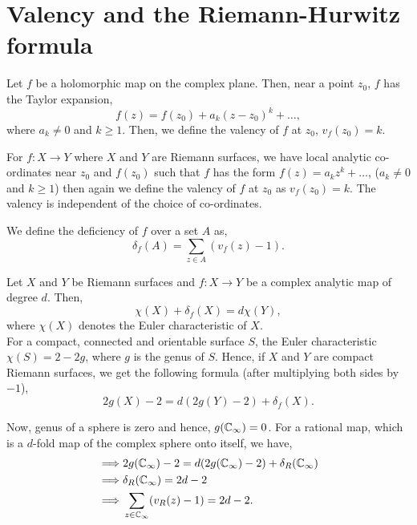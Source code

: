 \section{Valency and the Riemann-Hurwitz formula}
Let \( f \) be a holomorphic map on the complex plane. Then, near a point \( z_0 \), \( f \) has the Taylor expansion,\[
	f(z)=f(z_0)+a_k(z-z_0)^k+\ldots 
,\]  where \( a_k\neq 0 \) and \( k\ge 1 \). Then, we define the valency of \( f \) at \( z_0 \),
\( v_f(z_0)=k \).

For \( f:X\to Y \) where \( X \) and \( Y \) are Riemann surfaces, we have local analytic co-ordinates near \( z_0 \)
and \( f(z_0) \) such that \( f \) has the form \( f(z)=a_kz^k+\ldots  \), (\( a_k\neq 0 \) and \( k\ge 1 \))
then again we define the valency of \( f \)
at \( z_0 \) as \( v_f(z_0)=k \). The valency is independent of the choice of co-ordinates.

\begin{definition}[Deficiency]
	We define the deficiency of \( f \) over a set \( A \) as, \[
		\delta_f(A)=\sum_{z\in A} (v_f(z)-1)
	.\] 
\end{definition}

\begin{theorem}
	Let \( X \) and \( Y \) be Riemann surfaces and \( f:X\to Y \) be a complex analytic map of degree \( d \). Then,
	\[
		\chi(X)+\delta_f(X)=d\chi(Y)
	,\] where \( \chi(X) \) denotes the Euler characteristic of \( X \).\\
	For a compact, connected and orientable surface \( S \), the Euler characteristic \( \chi(S)=2-2g \),
	where \( g \) is the genus of \( S \). Hence, if \( X \) and \( Y \) are compact Riemann surfaces,
	we get the following formula (after multiplying both sides by \( -1 \)),\[
		2g(X)-2=d(2g(Y)-2)+\delta_f(X)
	.\] 
\end{theorem}

\begin{theorem}
Now, genus of a sphere is zero and hence, \( g(\mathbb{C}_\infty)=0 \).
For a rational map, which is a \( d \)-fold map of the complex sphere onto itself, we have,
\begin{align*}
	\implies & 2g(\mathbb{C}_\infty)-2=d(2g(\mathbb{C}_\infty)-2)+\delta_R(\mathbb{C}_\infty)\\
	\implies &\delta_R(\mathbb{C}_\infty)=2d-2\\
	\implies &\sum_{z\in \mathbb{C}_\infty}(v_R(z)-1)=2d-2
.\end{align*}
\end{theorem}

